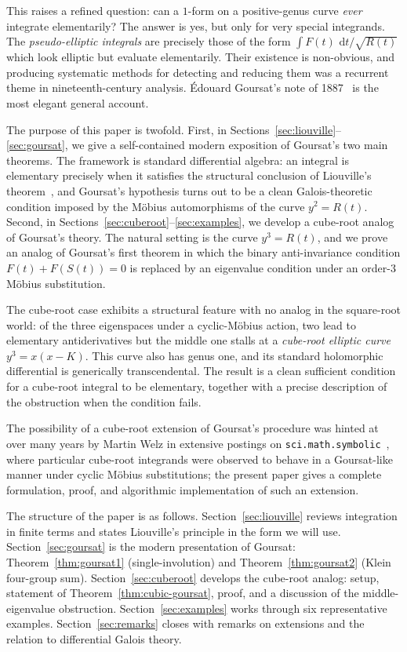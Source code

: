 \documentclass[11pt,a4paper]{article}
\theoremstyle{plain}
\theoremstyle{definition}
\theoremstyle{remark}
\renewcommand{\d}{\,\mathrm{d}}
\begin{document}
This raises a refined question: can a $1$-form on a positive-genus curve \emph{ever} integrate elementarily? The answer is yes, but only for very special integrands. The \emph{pseudo-elliptic integrals} are precisely those of the form $\int F(t)\,\d t/\sqrt{R(t)}$ which look elliptic but evaluate elementarily. Their existence is non-obvious, and producing systematic methods for detecting and reducing them was a recurrent theme in nineteenth-century analysis. \'Edouard Goursat's note of 1887~\cite{Goursat1887} is the most elegant general account.

The purpose of this paper is twofold. First, in Sections~\ref{sec:liouville}--\ref{sec:goursat}, we give a self-contained modern exposition of Goursat's two main theorems. The framework is standard differential algebra: an integral is elementary precisely when it satisfies the structural conclusion of Liouville's theorem~\cite{Rosenlicht1972}, and Goursat's hypothesis turns out to be a clean Galois-theoretic condition imposed by the M\"obius automorphisms of the curve $y^2 = R(t)$. Second, in Sections~\ref{sec:cuberoot}--\ref{sec:examples}, we develop a cube-root analog of Goursat's theory. The natural setting is the curve $y^3 = R(t)$, and we prove an analog of Goursat's first theorem in which the binary anti-invariance condition $F(t)+F(S(t))=0$ is replaced by an eigenvalue condition under an order-$3$ M\"obius substitution.

The cube-root case exhibits a structural feature with no analog in the square-root world: of the three eigenspaces under a cyclic-Möbius action, two lead to elementary antiderivatives but the middle one stalls at a \emph{cube-root elliptic curve} $y^3=x(x-K)$. This curve also has genus one, and its standard holomorphic differential is generically transcendental. The result is a clean sufficient condition for a cube-root integral to be elementary, together with a precise description of the obstruction when the condition fails.

The possibility of a cube-root extension of Goursat's procedure was hinted at over many years by Martin Welz in extensive postings on \texttt{sci.math.symbolic}~\cite{WelzNewsgroup}, where particular cube-root integrands were observed to behave in a Goursat-like manner under cyclic M\"obius substitutions; the present paper gives a complete formulation, proof, and algorithmic implementation of such an extension.

\medskip

The structure of the paper is as follows. Section~\ref{sec:liouville} reviews integration in finite terms and states Liouville's principle in the form we will use. Section~\ref{sec:goursat} is the modern presentation of Goursat: Theorem~\ref{thm:goursat1} (single-involution) and Theorem~\ref{thm:goursat2} (Klein four-group sum). Section~\ref{sec:cuberoot} develops the cube-root analog: setup, statement of Theorem~\ref{thm:cubic-goursat}, proof, and a discussion of the middle-eigenvalue obstruction. Section~\ref{sec:examples} works through six representative examples. Section~\ref{sec:remarks} closes with remarks on extensions and the relation to differential Galois theory.
\end{document}
